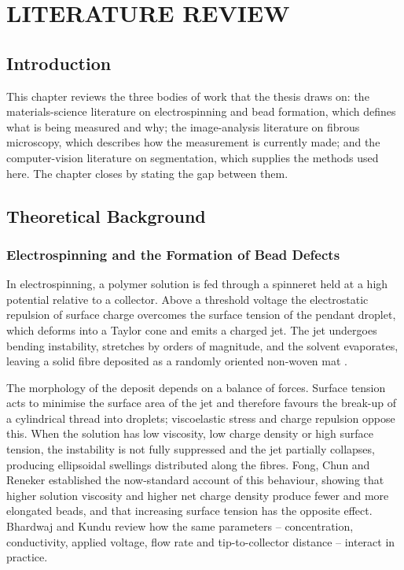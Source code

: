 \chapter{LITERATURE REVIEW}
\label{ch:literature}

\section{Introduction}

This chapter reviews the three bodies of work that the thesis draws on: the
materials-science literature on electrospinning and bead formation, which defines
what is being measured and why; the image-analysis literature on fibrous
microscopy, which describes how the measurement is currently made; and the
computer-vision literature on segmentation, which supplies the methods used here.
The chapter closes by stating the gap between them.

\section{Theoretical Background}

\subsection{Electrospinning and the Formation of Bead Defects}

In electrospinning, a polymer solution is fed through a spinneret held at a high
potential relative to a collector. Above a threshold voltage the electrostatic
repulsion of surface charge overcomes the surface tension of the pendant droplet,
which deforms into a Taylor cone and emits a charged jet. The jet undergoes bending
instability, stretches by orders of magnitude, and the solvent evaporates, leaving a
solid fibre deposited as a randomly oriented non-woven mat
\cite{doshi1995electrospinning, huang2003review}.

The morphology of the deposit depends on a balance of forces. Surface tension acts
to minimise the surface area of the jet and therefore favours the break-up of a
cylindrical thread into droplets; viscoelastic stress and charge repulsion oppose
this. When the solution has low viscosity, low charge density or high surface
tension, the instability is not fully suppressed and the jet partially collapses,
producing ellipsoidal swellings distributed along the fibres. Fong, Chun and Reneker
\cite{fong1999beaded} established the now-standard account of this behaviour,
showing that higher solution viscosity and higher net charge density produce fewer
and more elongated beads, and that increasing surface tension has the opposite
effect. Bhardwaj and Kundu \cite{bhardwaj2010electrospinning} review how the same
parameters -- concentration, conductivity, applied voltage, flow rate and
tip-to-collector distance -- interact in practice.

